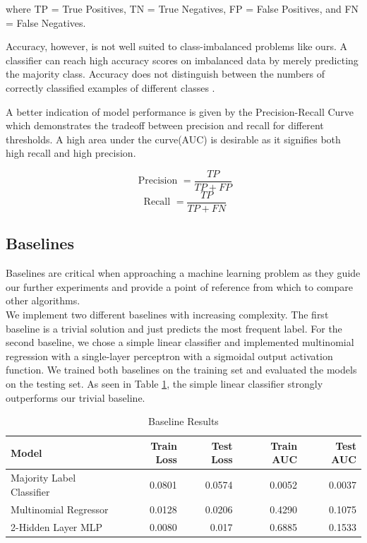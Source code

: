 \documentclass[bsc,frontabs,twoside,singlespacing,parskip,deptreport]{infthesis}     %
\let\Oldsubsection\subsection
\renewcommand{\subsection}{\FloatBarrier\Oldsubsection}
\begin{document}
where TP = True Positives, TN = True Negatives, FP = False Positives, and FN = False Negatives.

Accuracy, however, is not well suited to class-imbalanced problems like ours. A classifier can reach high accuracy scores on imbalanced data by merely predicting the majority class. Accuracy does not distinguish between the numbers of correctly classified examples of different classes \cite{galar_review_2012}.

A better indication of model performance is given by the Precision-Recall Curve which demonstrates the tradeoff between precision and recall for different thresholds. A high area under the curve(AUC) is desirable as it signifies both high recall and high precision.

\[\text { Precision }=\frac{TP}{TP+ FP}\]
\[\text { Recall }=\frac{TP}{TP+ FN}\]



\subsection{Baselines}
Baselines are critical when approaching a machine learning problem as they guide our further experiments and provide a point of reference from which to compare other algorithms.\\
We implement two different baselines with increasing complexity. The first baseline is a trivial solution and just predicts the most frequent label.
For the second baseline, we chose a simple linear classifier and implemented multinomial regression with a single-layer perceptron with a sigmoidal output activation function.
We trained both baselines on the training set and evaluated the models on the testing set. As seen in Table \ref{baseline_table}, the simple linear classifier strongly outperforms our trivial baseline.

\begin{table}[h!]
\centering
\begin{tabular}{lrrrr}
\toprule
{Model} &  Train Loss &  Test Loss & Train AUC & Test AUC  \\
\midrule
Majority Label Classifier &  0.0801 & 0.0574 & 0.0052 & 0.0037  \\
Multinomial Regressor  & 0.0128 & 0.0206 & 0.4290 & 0.1075 \\
2-Hidden Layer MLP & 0.0080 & 0.017 & 0.6885 & 0.1533 \\
\bottomrule
\end{tabular}
\caption{Baseline Results}\label{baseline_table}
\end{table}
\end{document}
